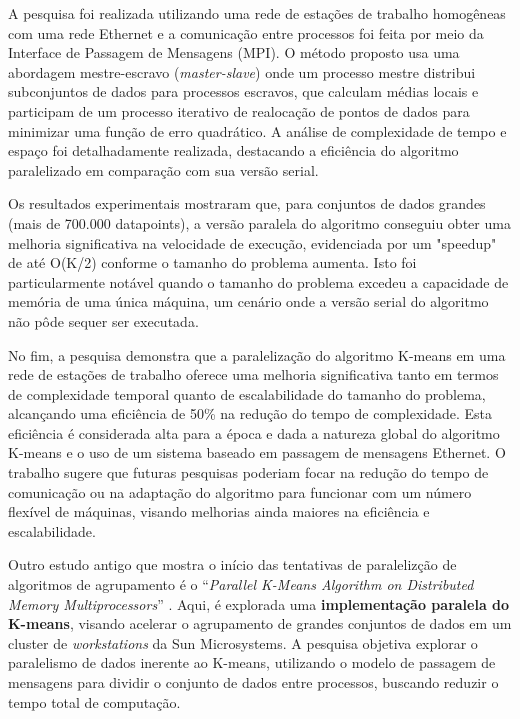 \documentclass[12pt,
openright, 
oneside, %
a4paper,    %
brazil]{facom-ufu-abntex2}
\begin{document}
A pesquisa foi realizada utilizando uma rede de estações de trabalho homogêneas com uma rede Ethernet e a comunicação entre processos foi feita por meio da Interface de Passagem de Mensagens (MPI). O método proposto usa uma abordagem mestre-escravo (\textit{master-slave}) onde um processo mestre distribui subconjuntos de dados para processos escravos, que calculam médias locais e participam de um processo iterativo de realocação de pontos de dados para minimizar uma função de erro quadrático. A análise de complexidade de tempo e espaço foi detalhadamente realizada, destacando a eficiência do algoritmo paralelizado em comparação com sua versão serial.

Os resultados experimentais mostraram que, para conjuntos de dados grandes (mais de 700.000 datapoints), a versão paralela do algoritmo conseguiu obter uma melhoria significativa na velocidade de execução, evidenciada por um "speedup" de até O(K/2) conforme o tamanho do problema aumenta. Isto foi particularmente notável quando o tamanho do problema excedeu a capacidade de memória de uma única máquina, um cenário onde a versão serial do algoritmo não pôde sequer ser executada.

No fim, a pesquisa demonstra que a paralelização do algoritmo K-means em uma rede de estações de trabalho oferece uma melhoria significativa tanto em termos de complexidade temporal quanto de escalabilidade do tamanho do problema, alcançando uma eficiência de 50\% na redução do tempo de complexidade. Esta eficiência é considerada alta para a época e dada a natureza global do algoritmo K-means e o uso de um sistema baseado em passagem de mensagens Ethernet. O trabalho sugere que futuras pesquisas poderiam focar na redução do tempo de comunicação ou na adaptação do algoritmo para funcionar com um número flexível de máquinas, visando melhorias ainda maiores na eficiência e escalabilidade.

Outro estudo antigo que mostra o início das tentativas de paralelizção de algoritmos de agrupamento é o \enquote{\textit{Parallel K-Means Algorithm on Distributed Memory Multiprocessors}} \cite{parallelKMeansJoshi2003}. Aqui, é explorada uma \textbf{implementação paralela do K-means}, visando acelerar o agrupamento de grandes conjuntos de dados em um cluster de \textit{workstations} da Sun Microsystems. A pesquisa objetiva explorar o paralelismo de dados inerente ao K-means, utilizando o modelo de passagem de mensagens para dividir o conjunto de dados entre processos, buscando reduzir o tempo total de computação.
\end{document}
